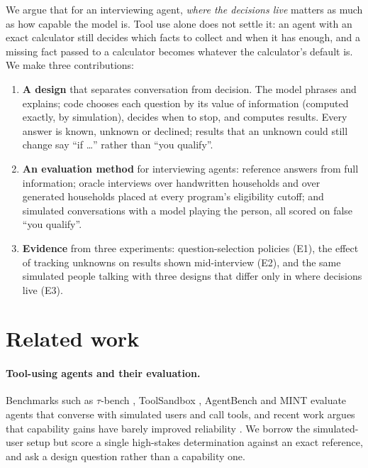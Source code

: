 \documentclass[11pt]{article}
\newcommand{\fq}{false ``you qualify''}
\begin{document}
We argue that for an interviewing agent, \emph{where the decisions live} matters as much as how capable the model is. Tool use alone does not settle it: an agent with an exact calculator still decides which facts to collect and when it has enough, and a missing fact passed to a calculator becomes whatever the calculator's default is. We make three contributions:
\begin{enumerate}
  \item \textbf{A design} that separates conversation from decision. The model phrases and explains; code chooses each question by its value of information (computed exactly, by simulation), decides when to stop, and computes results. Every answer is known, unknown or declined; results that an unknown could still change say ``if \ldots'' rather than ``you qualify''.
  \item \textbf{An evaluation method} for interviewing agents: reference answers from full information; oracle interviews over handwritten households and over generated households placed at every program's eligibility cutoff; and simulated conversations with a model playing the person, all scored on \fq.
  \item \textbf{Evidence} from three experiments: question-selection policies (E1), the effect of tracking unknowns on results shown mid-interview (E2), and the same simulated people talking with three designs that differ only in where decisions live (E3).
\end{enumerate}

\section{Related work}
\paragraph{Tool-using agents and their evaluation.} Benchmarks such as $\tau$-bench \citep{yao2024taubench,barres2025tau2bench}, ToolSandbox \citep{lu2024toolsandbox}, AgentBench \citep{liu2023agentbench} and MINT \citep{wang2023mint} evaluate agents that converse with simulated users and call tools, and recent work argues that capability gains have barely improved reliability \citep{rabanser2026agentreliability,raj2026consistency}. We borrow the simulated-user setup but score a single high-stakes determination against an exact reference, and ask a design question rather than a capability one.
\end{document}

